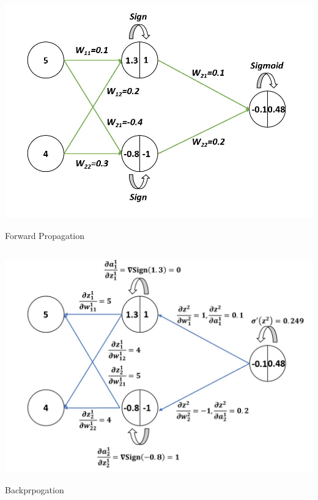 \documentclass{article}
\begin{document}
    	\begin{minipage}[t]{\linewidth}
        		\captionsetup{type=figure}
               	\centering
               	\includegraphics[width=0.6\linewidth]
                				{images/Q2a.jpg}
                \caption{Forward Propagation}      
        \end{minipage}
		$$$$
        \begin{minipage}[t]{\linewidth}
        		\captionsetup{type=figure}
               	\centering
               	\includegraphics[width=0.6\linewidth]
                				{images/Q2b.jpg}
                \caption{Backprpogation}      
        \end{minipage} 
        
\end{document}

